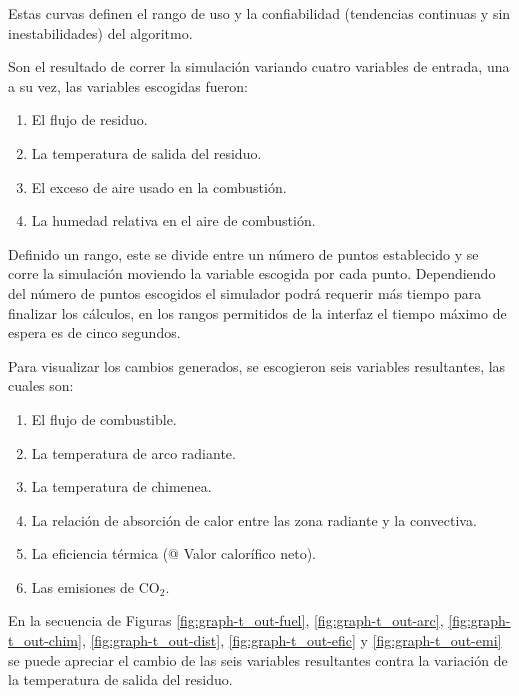 \par Estas curvas definen el rango de uso y la confiabilidad (tendencias continuas y sin inestabilidades) del algoritmo. 
\par Son el resultado de correr la simulación variando cuatro variables de entrada, una a su vez, las variables escogidas fueron:

\begin{enumerate}
\item El flujo de residuo.
\item La temperatura de salida del residuo.
\item El exceso de aire usado en la combustión.
\item La humedad relativa en el aire de combustión.
\end{enumerate}

\par Definido un rango, este se divide entre un número de puntos establecido y se corre la simulación moviendo la variable escogida por cada punto. Dependiendo del número de puntos escogidos el simulador podrá requerir más tiempo para finalizar los cálculos, en los rangos permitidos de la interfaz el tiempo máximo de espera es de cinco segundos.
\par Para visualizar los cambios generados, se escogieron seis variables resultantes, las cuales son:

\begin{enumerate}
\item El flujo de combustible.
\item La temperatura de arco radiante.
\item La temperatura de chimenea.
\item La relación de absorción de calor entre las zona radiante y la convectiva.
\item La eficiencia térmica (@ Valor calorífico neto).
\item Las emisiones de CO$_2$.
\end{enumerate}

\par En la secuencia de Figuras \ref{fig:graph-t_out-fuel}, \ref{fig:graph-t_out-arc}, \ref{fig:graph-t_out-chim}, \ref{fig:graph-t_out-dist}, \ref{fig:graph-t_out-efic} y \ref{fig:graph-t_out-emi} se puede apreciar el cambio de las seis variables resultantes contra la variación de la temperatura de salida del residuo.

